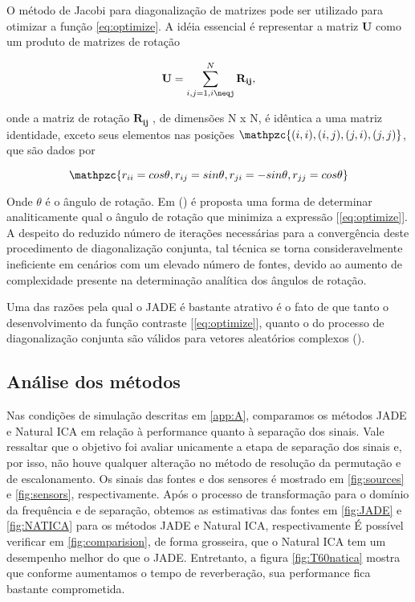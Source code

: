     O método de Jacobi para diagonalização de matrizes pode ser utilizado para otimizar a função \ref{eq:optimize}. A idéia essencial é representar a matriz $\mathbf{U}$ como um produto de matrizes de rotação
    
    \begin{equation}
        \mathbf{U} = \sum_{i,j=1,i\neqj}^N \mathbf{R_{ij}},
    \end{equation}
    
    onde a matriz de rotação $\mathbf{R_{ij}}$ , de dimensões N x N, é idêntica a uma matriz identidade, exceto seus elementos nas posições $\mathpzc{(i,i), (i,j), (j,i), (j,j)}$, que são dados por 
    
    \begin{equation}
        \mathpzc{r_{ii} = cos \theta, r_{ij} = sin \theta, r_{ji} = -sin \theta, r_{jj} = cos \theta}
    \end{equation}
    
    Onde $\theta$ é o ângulo de rotação. Em (\cite{JADE}) é proposta uma forma de determinar analiticamente qual o ângulo de rotação que minimiza a expressão [\ref{eq:optimize}]. A despeito do reduzido número de iterações necessárias para a convergência deste procedimento de diagonalização conjunta, tal técnica se torna consideravelmente ineficiente em cenários com um elevado número de fontes, devido ao aumento de complexidade presente na determinação analítica dos ângulos de rotação.
    
    Uma das razões pela qual o JADE é bastante atrativo é o fato de que tanto o desenvolvimento da função contraste [\ref{eq:optimize}], quanto o do processo de diagonalização conjunta são válidos para vetores aleatórios complexos (\cite{JADE}). 

    \subsection{Análise dos métodos}
    
    Nas condições de simulação descritas em \ref{app:A}, comparamos os métodos JADE e Natural ICA em relação à performance quanto à separação dos sinais. Vale ressaltar que o objetivo foi avaliar unicamente a etapa de separação dos sinais e, por isso, não houve qualquer alteração no método de resolução da permutação e de escalonamento. 
    Os sinais das fontes e dos sensores é mostrado em  \ref{fig:sources} e \ref{fig:sensors}, respectivamente. Após o processo de transformação para o domínio da frequência e de separação, obtemos as estimativas das fontes em \ref{fig:JADE} e \ref{fig:NATICA} para os métodos JADE e Natural ICA, respectivamente É possível verificar em \ref{fig:comparision}, de forma grosseira, que o Natural ICA tem um desempenho melhor do que o JADE. Entretanto, a figura \ref{fig:T60natica} mostra que conforme aumentamos o tempo de reverberação, sua performance fica bastante comprometida.
    
